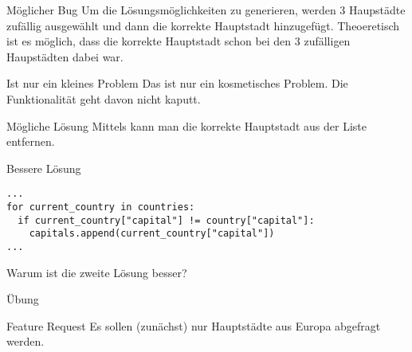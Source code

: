 \begin{frame}
\begin{alertblock}{Möglicher Bug}
\vspace{2pt}
Um die Lösungsmöglichkeiten zu generieren, werden 3 Haupstädte zufällig ausgewählt und dann die korrekte Hauptstadt hinzugefügt. 
Theoeretisch ist es möglich, dass die korrekte Hauptstadt schon bei den 3 zufälligen Haupstädten dabei war. 
\end{alertblock}
\pause
\vspace{12pt} 
\begin{exampleblock}{Ist nur ein kleines Problem}
\vspace{2pt}
Das ist nur ein kosmetisches Problem. Die Funktionalität geht davon nicht kaputt. 
\end{exampleblock}
\end{frame}


\begin{fragile}
\begin{block}{Mögliche Lösung}
\vspace{2pt}
Mittels  kann man die korrekte Hauptstadt aus der Liste  entfernen. 
\end{block}

\pause 
\vspace{12pt}
\begin{block}{Bessere Lösung}
\vspace{2pt}
\begin{verbatim}
...
for current_country in countries:
  if current_country["capital"] != country["capital"]:
    capitals.append(current_country["capital"])
...
\end{verbatim}
\end{block}

\pause 
\vspace{12pt}


Warum ist die zweite Lösung besser?


\end{fragile}

\begin{frame}{Übung}

\begin{block}{Feature Request}
\vspace{2pt}
Es sollen (zunächst) nur Hauptstädte aus Europa abgefragt werden.
\end{block}
	
\end{frame}



